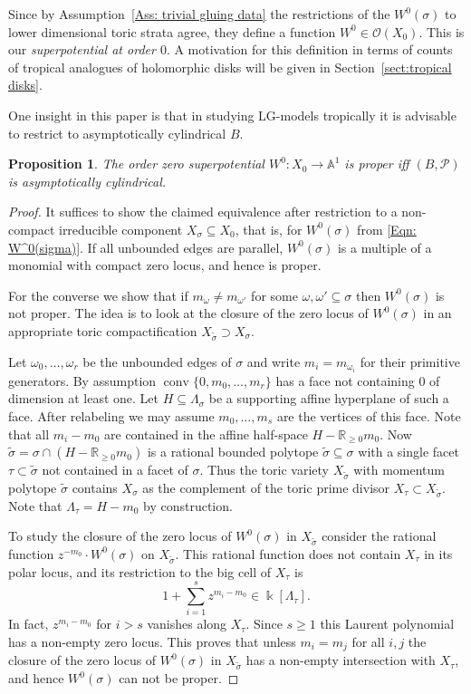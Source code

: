 \documentclass[11pt,letter]{amsart}
\newtheorem{proposition}[theorem]{Proposition}
\theoremstyle{definition}
\theoremstyle{remark}
\numberwithin{equation}{section}
\numberwithin{figure}{section}
\newcommand{\RR} {\mathbb{R}}
\renewcommand{\AA} {\mathbb{A}}
\newcommand {\conv} {\operatorname{conv}}
\newcommand {\kk} {\Bbbk}
\renewcommand{\O}  {\mathcal{O}}
\renewcommand{\P}  {\mathscr{P}}
\begin{document}
Since by Assumption~\ref{Ass: trivial gluing data} the restrictions of the
$W^0(\sigma)$ to lower dimensional toric strata agree, they define a function
$W^0\in\O(X_0)$. This is our \emph{superpotential at order $0$}. A motivation
for this definition in terms of counts of tropical analogues of holomorphic
disks will be given in Section~\ref{sect:tropical disks}.

One insight in this paper is that in studying LG-models tropically it is
advisable to restrict to asymptotically cylindrical $B$.

\begin{proposition}
\label{properness criterion}
The order zero superpotential $W^0:X_0\to\AA^1$ is proper iff $(B,\P)$ is
asymptotically cylindrical. 
\end{proposition}

\begin{proof}
It suffices to show the claimed equivalence after restriction to a non-compact
irreducible component $X_\sigma\subseteq X_0$, that is, for $W^0(\sigma)$ from
\eqref{Eqn: W^0(sigma)}. If all unbounded edges are parallel, $W^0(\sigma)$ is a
multiple of a monomial with compact zero locus, and hence is proper.

For the converse we show that if $m_{\omega}\neq m_{\omega'}$ for some
$\omega,\omega' \subseteq\sigma$ then $W^0(\sigma)$ is not proper. The idea is
to look at the closure of the zero locus of $W^0(\sigma)$ in an appropriate
toric compactification $X_{\tilde \sigma}\supset X_\sigma$.

Let $\omega_0,\ldots,\omega_r$ be the unbounded edges of $\sigma$ and write
$m_i=m_{\omega_i}$ for their primitive generators. By assumption
$\conv\{0,m_0,\ldots,m_r\}$ has a face not containing $0$ of dimension at least
one. Let $H\subseteq \Lambda_\sigma$ be a supporting affine hyperplane of such a
face. After relabeling we may assume $m_0,\ldots,m_s$ are the vertices of this
face. Note that all $m_i-m_0$ are contained in the affine half-space $H-\RR_{\ge
0} m_0$. Now $\tilde\sigma= \sigma\cap(H-\RR_{\ge 0} m_0)$ is a rational bounded
polytope $\tilde\sigma\subseteq \sigma$ with a single facet $\tau\subset
\tilde\sigma$ not contained in a facet of $\sigma$. Thus the toric variety
$X_{\tilde\sigma}$ with momentum polytope $\tilde\sigma$ contains $X_\sigma$ as
the complement of the toric prime divisor $X_\tau\subset X_{\tilde \sigma}$.
Note that $\Lambda_\tau= H-m_0$ by construction. 

To study the closure of the zero locus of $W^0(\sigma)$ in $X_{\tilde\sigma}$
consider the rational function $z^{-m_0}\cdot W^0(\sigma)$ on
$X_{\tilde\sigma}$. This rational function does not contain $X_\tau$ in its
polar locus, and its restriction to the big cell of $X_\tau$ is
\[
1+\sum_{i=1}^s z^{m_i-m_0}\in \kk[\Lambda_\tau].
\]
In fact, $z^{m_i-m_0}$ for $i>s$ vanishes along $X_\tau$. Since $s\ge 1$ this
Laurent polynomial has a non-empty zero locus. This proves that unless $m_i=m_j$
for all $i,j$ the closure of the zero locus of $W^0(\sigma)$ in
$X_{\tilde\sigma}$ has a non-empty intersection with $X_\tau$, and hence
$W^0(\sigma)$ can not be proper. 
\end{proof}
\end{document}

